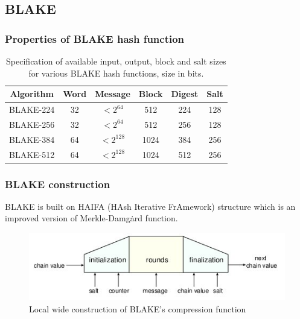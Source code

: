 \documentclass{beamer}
\begin{document}
\subsection{BLAKE}

\begin{frame}
\frametitle{Properties of BLAKE hash function}
\begin{table}[h]
  \begin{center}
    \begin{tabular}{ *{6}{c} } \hline
      Algorithm & Word & Message    & Block & Digest & Salt \\ \hline
      BLAKE-224 & 32   & $< 2^{64}$  & 512   & 224    & 128  \\
      BLAKE-256 & 32   & $< 2^{64}$  & 512   & 256    & 128  \\
      BLAKE-384 & 64   & $< 2^{128}$ & 1024  & 384    & 256  \\
      BLAKE-512 & 64   & $< 2^{128}$ & 1024  & 512    & 256  \\ \hline
    \end{tabular}
    \caption{Specification of available input, output, block and salt sizes for various BLAKE hash functions,
    size in bits. \footnotemark}
  \end{center}
\end{table}
\end{frame}

\begin{frame}
\frametitle{BLAKE construction}
BLAKE is built on HAIFA (HAsh Iterative FrAmework) structure \footnotemark which is an improved version of 
Merkle-Damg\.{a}rd function.
\begin{figure}[h]
  \begin{center}
    \includegraphics[scale=0.5]{blakelocalwidepipeconstruction.jpg}
  \end{center}
  \caption{Local wide construction of BLAKE's compression function\footnotemark}
  \label{fig:seq}
\end{figure}
\end{frame}
\end{document}
